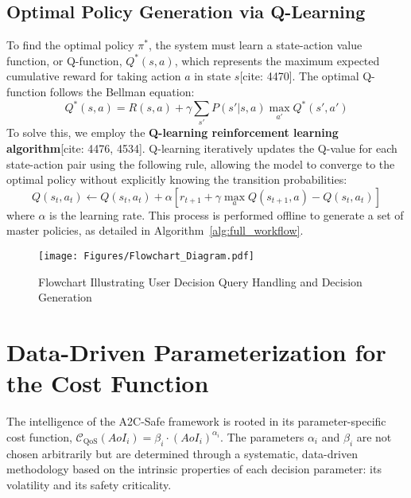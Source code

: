 \documentclass[journal]{IEEEtran}
\begin{document}
\subsection{Optimal Policy Generation via Q-Learning}
To find the optimal policy $\pi^*$, the system must learn a state-action value function, or Q-function, $Q^*(s,a)$, which represents the maximum expected cumulative reward for taking action $a$ in state $s$[cite: 4470]. The optimal Q-function follows the Bellman equation:
\begin{equation}
    Q^{*}(s,a) = R(s,a) + \gamma\sum_{s'} P(s'|s,a) \max_{a'} Q^{*}(s',a')
\end{equation}
To solve this, we employ the \textbf{Q-learning reinforcement learning algorithm}[cite: 4476, 4534]. Q-learning iteratively updates the Q-value for each state-action pair using the following rule, allowing the model to converge to the optimal policy without explicitly knowing the transition probabilities:
\begin{equation}
    Q(s_t,a_t) \leftarrow Q(s_t,a_t) + \alpha[r_{t+1} + \gamma \max_{a} Q(s_{t+1},a) - Q(s_t,a_t)]
\end{equation}
where $\alpha$ is the learning rate. This process is performed offline to generate a set of master policies, as detailed in Algorithm~\ref{alg:full_workflow}.

\begin{figure}[!ht]
    \centering
    \texttt{[image: Figures/Flowchart\_Diagram.pdf]}
    \caption{Flowchart Illustrating User Decision Query Handling and Decision Generation}
    \label{fig:mdp_flowchart}
\end{figure}


\section{Data-Driven Parameterization for the Cost Function}

The intelligence of the A2C-Safe framework is rooted in its parameter-specific cost function, $\mathcal{C}_{\text{QoS}}(AoI_i) = \beta_i \cdot (AoI_i)^{\alpha_i}$. The parameters $\alpha_i$ and $\beta_i$ are not chosen arbitrarily but are determined through a systematic, data-driven methodology based on the intrinsic properties of each decision parameter: its volatility and its safety criticality.
\end{document}
